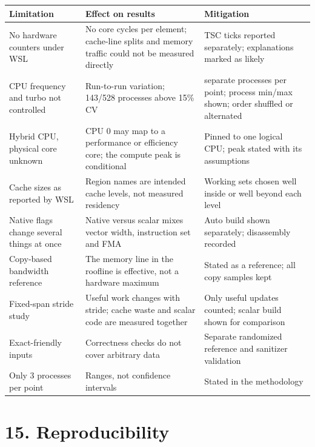 \documentclass[10pt,letterpaper]{article}
\begin{document}
{\footnotesize\begin{longtable}{>{\raggedright\arraybackslash}p{0.2644\dimexpr\linewidth-6\tabcolsep\relax}>{\raggedright\arraybackslash}p{0.3678\dimexpr\linewidth-6\tabcolsep\relax}>{\raggedright\arraybackslash}p{0.3678\dimexpr\linewidth-6\tabcolsep\relax}}\toprule
\textbf{Limitation} & \textbf{Effect on results} & \textbf{Mitigation} \\ \midrule\endhead
No hardware counters under WSL & No core cycles per element; cache-line splits and memory traffic could not be measured directly & TSC ticks reported separately; explanations marked as likely \\
CPU frequency and turbo not controlled & Run-to-run variation; 143/528 processes above 15\% CV & 3 separate processes per point; process min/max shown; order shuffled or alternated \\
Hybrid CPU, physical core unknown & CPU 0 may map to a performance or efficiency core; the compute peak is conditional & Pinned to one logical CPU; peak stated with its assumptions \\
Cache sizes as reported by WSL & Region names are intended cache levels, not measured residency & Working sets chosen well inside or well beyond each level \\
Native flags change several things at once & Native versus scalar mixes vector width, instruction set and FMA & Auto build shown separately; disassembly recorded \\
Copy-based bandwidth reference & The memory line in the roofline is effective, not a hardware maximum & Stated as a reference; all copy samples kept \\
Fixed-span stride study & Useful work changes with stride; cache waste and scalar code are measured together & Only useful updates counted; scalar build shown for comparison \\
Exact-friendly inputs & Correctness checks do not cover arbitrary data & Separate randomized reference and sanitizer validation \\
Only 3 processes per point & Ranges, not confidence intervals & Stated in the methodology \\
\bottomrule\end{longtable}}

\section*{15. Reproducibility}
\end{document}
